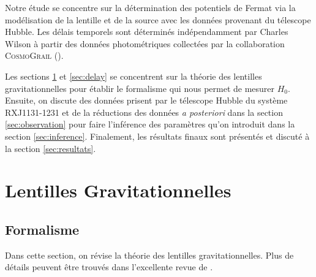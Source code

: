 \documentclass[times,10pt,twocolumn]{article}
\begin{document}
Notre étude se concentre sur la détermination des potentiels de Fermat 
via la modélisation de la lentille et de la source avec les données provenant du 
télescope Hubble. Les délais temporels sont déterminés indépendamment par 
Charles Wilson à partir 
des données photométriques collectées par la collaboration \textsc{CosmoGrail} 
(\citet{Tewes2013}).

Les sections \ref{sec:lens} et \ref{sec:delay} se concentrent sur la 
théorie des lentilles gravitationnelles pour établir le formalisme 
qui nous permet de mesurer $H_0$. Ensuite, on discute des données 
prisent par le télescope Hubble du système RXJ1131-1231 et de la réductions 
des données \textit{a posteriori} dans la section \ref{sec:observation} 
pour faire l'inférence des paramètres 
qu'on introduit dans la section \ref{sec:inference}.
Finalement, les résultats finaux sont présentés et discuté à la section 
\ref{sec:resultats}.






\section{Lentilles Gravitationnelles}\label{sec:lens}
\subsection{Formalisme}
Dans cette section, on révise la théorie des lentilles gravitationnelles. 
Plus de détails peuvent être trouvés dans l'excellente revue de \citet{Treu2010}. \par
\end{document}
